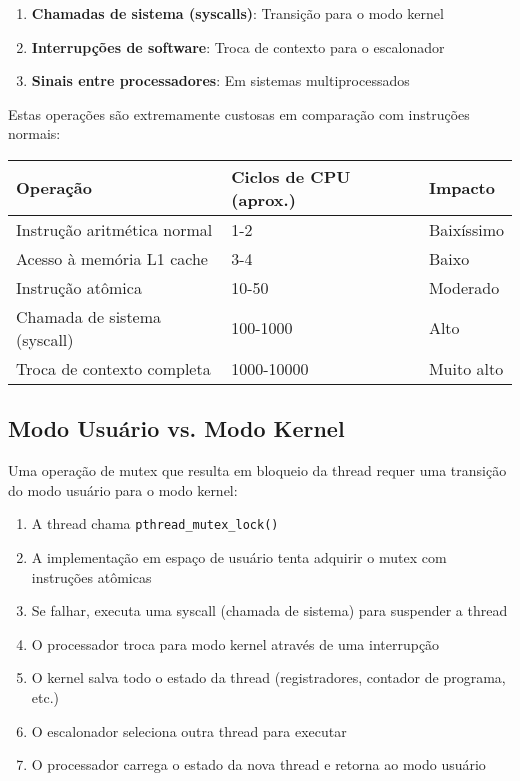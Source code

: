 \documentclass[12pt]{article}
\begin{document}
\begin{enumerate}
    \item \textbf{Chamadas de sistema (syscalls)}: Transição para o modo kernel
    \item \textbf{Interrupções de software}: Troca de contexto para o escalonador
    \item \textbf{Sinais entre processadores}: Em sistemas multiprocessados
\end{enumerate}

Estas operações são extremamente custosas em comparação com instruções normais:

\begin{tabulary}{\linewidth}{|L|L|L|}
\hline
\textbf{Operação} & \textbf{Ciclos de CPU (aprox.)} & \textbf{Impacto} \\
\hline
Instrução aritmética normal & 1-2 & Baixíssimo \\
\hline
Acesso à memória L1 cache & 3-4 & Baixo \\
\hline
Instrução atômica & 10-50 & Moderado \\
\hline
Chamada de sistema (syscall) & 100-1000 & Alto \\
\hline
Troca de contexto completa & 1000-10000 & Muito alto \\
\hline
\end{tabulary}

\subsection{Modo Usuário vs. Modo Kernel}

Uma operação de mutex que resulta em bloqueio da thread requer uma transição do modo usuário para o modo kernel:

\begin{enumerate}
    \item A thread chama \texttt{pthread\_mutex\_lock()}
    \item A implementação em espaço de usuário tenta adquirir o mutex com instruções atômicas
    \item Se falhar, executa uma syscall (chamada de sistema) para suspender a thread
    \item O processador troca para modo kernel através de uma interrupção
    \item O kernel salva todo o estado da thread (registradores, contador de programa, etc.)
    \item O escalonador seleciona outra thread para executar
    \item O processador carrega o estado da nova thread e retorna ao modo usuário
\end{enumerate}
\end{document}
